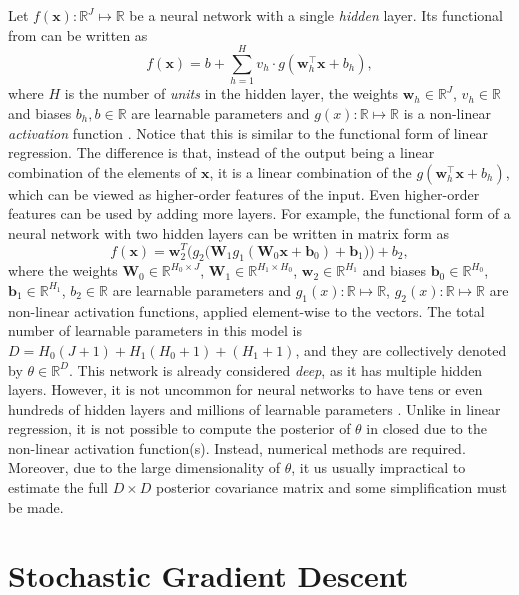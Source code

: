 \documentclass[msc,deptreport.inf]{infthesis} %
\newcommand{\matr}[1]{\mathbf{#1}}
\newcommand{\R}{\mathbb R}
\begin{document}
Let $f(\matr{x}): \R^J \mapsto \R$ be a neural network with a single \emph{hidden} layer. Its functional from can be written as
\begin{equation}
	f(\matr{x}) = b + \sum_{h=1}^H v_h \cdot g(\matr{w}_h^\intercal \matr{x} + b_h),
\end{equation} 
where $H$ is the number of \emph{units} in the hidden layer, the weights $\matr{w}_h \in \R^J$, $v_h \in \R$ and biases $b_h, b \in \R$ are learnable parameters and $g(x):\R \mapsto \R$ is a non-linear \emph{activation} function \cite{goodfellow2016}. Notice that this is similar to the functional form of linear regression. The difference is that, instead of the output being a linear combination of the elements of $\matr{x}$, it is a linear combination of the $g(\matr{w}_h^\intercal \matr{x} + b_h)$, which can be viewed as higher-order features of the input.  Even higher-order features can be used by adding more layers. For example, the functional form of a neural network with two hidden layers can be written in matrix form as
\begin{equation}\label{eqn:multi_layer_nn}
	f(\matr{x}) = \matr{w}_2^T \Big(g_2\big(\matr{W}_1 g_1(\matr{W}_0 \matr{x} + \matr{b}_0) + \matr{b}_1 \big) \Big) + b_2,
\end{equation} 
where the weights $\matr{W}_0 \in \R^{H_0 \times J}$, $\matr{W}_1 \in \R^{H_1 \times H_0}$, $\matr{w}_2 \in \R^{H_1}$ and biases $\matr{b}_0 \in \R^{H_0}$, $\matr{b}_1 \in \R^{H_1}$, $b_2 \in \R$ are learnable parameters and $g_1(x):\R \mapsto \R$, $g_2(x):\R \mapsto \R$ are non-linear activation functions, applied element-wise to the vectors. The total number of learnable parameters in this model is $D=H_0(J + 1) + H_1(H_0 + 1) + (H_1 + 1)$, and they are collectively denoted by $\theta \in \R^D$. This network is already considered \emph{deep}, as it has multiple hidden layers. However, it is not uncommon for neural networks to have tens or even hundreds of hidden layers and millions of learnable parameters \cite{krizhevsky09} \cite{he2015}. Unlike in linear regression, it is not possible to compute the posterior of $\theta$ in closed due to the non-linear activation function(s). Instead, numerical methods are required. Moreover, due to the large dimensionality of $\theta$, it us usually impractical to estimate the full $D \times D$ posterior covariance matrix and some simplification must be made.  


\section{Stochastic Gradient Descent}
\end{document}
